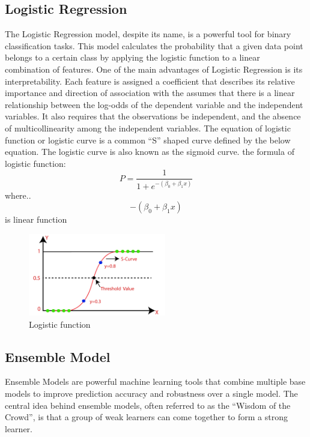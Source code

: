 \documentclass[12pt]{report}
\begin{document}
\subsection*{Logistic Regression}
The Logistic Regression model, despite its name, is a powerful tool for binary
classification tasks. This model calculates the probability that a given data
point belongs to a certain class by applying the logistic function to a linear
combination of features\cite{hosmer2013applied}. One of the main advantages of
Logistic Regression is its interpretability. Each feature is assigned a
coefficient that describes its relative importance and direction of association
with the assumes that there is a linear relationship between the log-odds of
the dependent variable and the independent variables. It also requires that the
observations be independent, and the absence of multicollinearity among the
independent variables\cite{peng2002introduction}. The equation of logistic
function or logistic curve is a common “S” shaped curve defined by the below
equation. The logistic curve is also known as the sigmoid
curve\cite{sharma2022logistic}. the formula of logistic function: \[ P=\frac{1}{1+e^{-\left(\beta_0+\beta_1 x\right)}} \]
where..\\$$ {-\left(\beta_0+\beta_1 x\right)} $$ is linear function

\begin{figure}[ht]
    \centering
    \includegraphics[width=6cm]{./figures/logistic-regression-in-machine-learning.png}
    \caption{Logistic function}\label{fig:fig3}
\end{figure}

\newpage
\subsection*{Ensemble Model}
Ensemble Models are powerful machine learning tools that combine multiple base
models to improve prediction accuracy and robustness over a single model. The
central idea behind ensemble models, often referred to as the ``Wisdom of the
Crowd'', is that a group of weak learners can come together to form a strong
learner\cite{dietterich2000ensemble}.\newline
\end{document}

